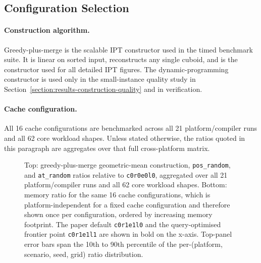 \documentclass[manuscript,screen,review]{acmart}
\theoremstyle{definition}
\theoremstyle{plain}
\begin{document}
\subsection{Configuration Selection}
\label{section:selection}

\paragraph{Construction algorithm.}
Greedy-plus-merge is the scalable IPT constructor used in the timed
benchmark suite. It is linear on sorted input, reconstructs any single
cuboid, and is the constructor used for all detailed IPT figures. The
dynamic-programming constructor is used only in the small-instance
quality study in Section~\ref{section:results-construction-quality}
and in verification.

\paragraph{Cache configuration.}
All 16 cache configurations are benchmarked across all 21
platform/compiler runs and all 62 core workload shapes.
Unless stated otherwise, the ratios quoted in this paragraph are
aggregates over that full cross-platform matrix.

\begin{figure}
\centering

\caption{Top: greedy-plus-merge geometric-mean construction,
  \texttt{pos\_random}, and \texttt{at\_random} ratios relative to
  \texttt{c0r0e0l0},
  aggregated over all 21 platform/compiler runs and all 62 core
  workload shapes. Bottom: memory ratio for the same 16 cache
  configurations, which is platform-independent for a fixed cache
  configuration and therefore shown once per configuration, ordered by
  increasing memory footprint. The paper default \texttt{c0r1e1l0} and
  the query-optimised frontier point \texttt{c0r1e1l1} are shown in
  bold on the x-axis. Top-panel error bars span the 10th to 90th
  percentile of the per-(platform, scenario, seed, grid) ratio
  distribution.}
\label{figure:at-cache}
\end{figure}
\end{document}
